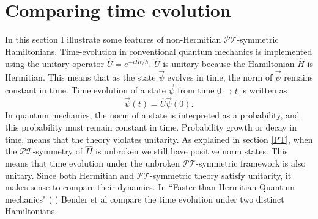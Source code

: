 \documentclass[12pt, a4paper]{report}
\newcommand\PT{\(\mathcal{PT}\)}
\begin{document}
\section{Comparing time evolution}\label{Interlude}

In this section I illustrate some features of non-Hermitian \PT-symmetric Hamiltonians. Time-evolution in conventional quantum mechanics is implemented using the unitary operator $\hat{U} = e^{-i\hat{H}t/\hbar}$.
$\hat{U}$ is unitary because the Hamiltonian $\hat{H}$ is Hermitian. This means that as the state $\vec{\psi}$ evolves in time, the norm of $\vec{\psi}$ remains constant in time. Time evolution of a state $\vec{\psi}$ from time $0 \rightarrow t$ is written as
\begin{equation}
\vec{\psi}(t) = \hat{U} \vec{\psi}(0).
\end{equation}
In quantum mechanics, the norm of a state is interpreted as a probability, and this probability must remain constant in time. Probability growth or decay in time, means that the theory violates unitarity. As explained in section \ref{PT}, when the \PT-symmetry of $\hat{H}$ is unbroken we still have positive norm states. This means that time evolution under the unbroken \PT-symmetric framework is also unitary\cite{Jones-Smith}\cite{ComplexExtension}\cite{Mostafazadeh2}. Since both Hermitian and \PT-symmetric theory satisfy unitarity, it makes sense to compare their dynamics. In ``Faster than Hermitian Quantum mechanics" (\cite{Bender_2007} ) Bender et al compare the time evolution under two distinct Hamiltonians. 
\end{document}
